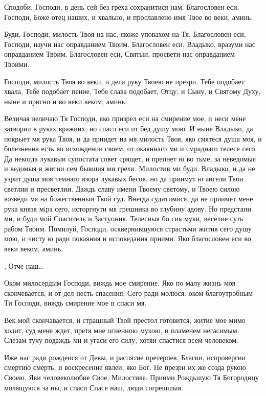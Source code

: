 \begin{mymulticols}
Сподоби, Господи, в день сей без греха сохранитися нам. Благословен еси, Господи, Боже отец наших, и хвально, и прославлено имя Твое во веки, аминь.

Буди, Господи, милость Твоя на нас, якоже уповахом на Тя. Благословен еси, Господи, научи нас оправданием Твоим. Благословен еси, Владыко, вразуми нас оправданием Твоим. Благословен еси, Святыи, просвети нас оправданием Твоими.

Господи, милость Твоя во веки, и дела руку Твоею не презри. Тебе подобает хвала, Тебе подобает пение, Тебе слава подобает, Отцу, и Сыну, и Святому Духу, ныне и присно и во веки веком, аминь.



Величая величаю Тя Господи, яко призрел еси на смирение мое, и неси мене затворил в руках вражиих, но спасл еси от бед душу мою. И ныне Владыко, да покрыет мя рука Твоя, и да приидет на мя милость Твоя, яко смятеся душа моя, и болезненна есть во исхождении своем, от окаяннаго ми и смраднаго телесе сего. Да некогда лукавыи супостата совет срящет, и препнет ю во тьме, за неведомыя и ведомыя в житии сем бывшия ми грехи. Милостив ми буди, Владыко, и да не узрит душа моя темнаго взора лукавых бесов, но да приимут ю ангели Твои светлии и пресветлии. Даждь славу имени Твоему святому, и Твоею силою возведи мя на божественныи Твой суд. Внегда судитимися, да не приимет мене рука князя мiра сего, исторгнути мя грешника во глубину адову. Но предстани ми, и буди мой Спаситель и Заступник. Телесныя бо сия муки, веселие суть рабом Твоим. Помилуй, Господи, осквернившуюся страстьми жития сего душу мою, и чисту ю ради покаяния и исповедания приими. Яко благословен еси во веки веком, аминь.


 ,  Отче наш…





Оком милосердым Господи, виждь мое смирение. Яко по малу жизнь моя скончевается, и от дел несть спасения. Сего ради молюся: оком благоутробным Ти Господи, виждь смирение мое и спаси мя.

 Век мой скончавается, и страшный Твой престол готовится, житие мое мимо ходит, суд мене ждет, претя мне огненною мукою, и пламенем негасимым. Слезам тучу подаждь ми и угаси его силу, хотяи спастися всем человеком.

 Иже нас ради рождеися от Девы, и распятие претерпев, Благии, испровергии смертию смерть, и воскресение явлеи, яко Бог. Не презри их же созда рукою Своею. Яви человеколюбие Свое, Милостиве. Приими Рождьшую Тя Богородицу молящуюся за ны, и спаси Спасе наш, люди согрешшыя.


\end{mymulticols}
